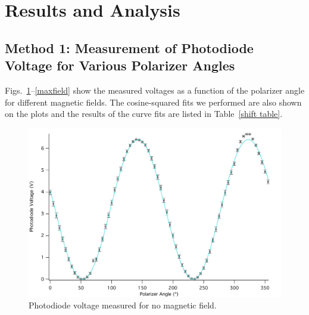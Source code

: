 \documentclass[prb,preprint]{revtex4-1}
\begin{document}
\section{Results and Analysis}
{\subsection{Method 1: Measurement of Photodiode Voltage for Various Polarizer Angles}
{Figs.~\ref{nofield}--\ref{maxfield} show the measured voltages as a function of the polarizer angle for different magnetic fields. 
The cosine-squared fits we performed are also shown on the plots and the results of the curve fits are listed in Table~\ref{shift table}.

\begin{figure}[h]
\includegraphics[width = 5.8in]{0A.pdf}
\caption{\label{nofield}Photodiode voltage measured for no magnetic field.}
\end{figure}

}}
\end{document}
